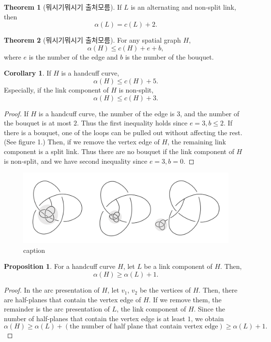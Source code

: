\documentclass{article}
\theoremstyle{definition}
\theoremstyle{theorem}
\newtheorem{theorem}{Theorem}
\theoremstyle{proposition}
\newtheorem{prop}{Proposition}
\theoremstyle{corollary}
\newtheorem*{corol}{Corollary}
\begin{document}
\begin{theorem}[뭐시기뭐시기 출처모름]
    If $L$ is an alternating and non-split link, then
    \[ \alpha(L) = c(L)+2. \]
\end{theorem}

\begin{theorem}[뭐시기뭐시기 출처모름]
    For any spatial graph $H$,
    \[ \alpha(H) \leq c(H)+e+b, \]
    where $e$ is the number of the edge and $b$ is the number of the bouquet.
\end{theorem}

\begin{corol}
    If $H$ is a handcuff curve,
    \[ \alpha(H) \leq c(H)+5. \]
    Especially, if the link component of $H$ is non-split,
    \[ \alpha(H) \leq c(H)+3. \]
\end{corol}

\begin{proof}
    If $H$ is a handcuff curve, the number of the edge is $3$, and the number of the bouquet is at most $2$. Thus the first inequality holds since $e=3, b \leq 2$. If there is a bouquet, one of the loops can be pulled out without affecting the rest. (See figure 1.) Then, if we remove the vertex edge of $H$, the remaining link component is a split link. Thus there are no bouquet if the link component of $H$ is non-split, and we have second inequality since $e=3, b=0$.
\end{proof}

\begin{figure}
    \centerline{\includegraphics[width=\textwidth]{image.png}}
    \caption{caption}
    \label{figure_4} 
\end{figure}

\begin{prop}
    For a handcuff curve $H$, let $L$ be a link component of $H$. Then,
    \[ \alpha(H) \geq \alpha(L)+1. \]
\end{prop}
\begin{proof}
    In the arc presentation of $H$, let $v_1$, $v_2$ be the vertices of $H$. Then, there are half-planes that contain the vertex edge of $H$. If we remove them, the remainder is the arc presentation of $L$, the link component of $H$. Since the number of half-planes that contain the vertex edge is at least $1$, we obtain
    \[ \alpha(H) \geq \alpha(L) + (\text{the number of half plane that contain vertex edge}) \geq \alpha(L)+1. \]
\end{proof}
\end{document}

